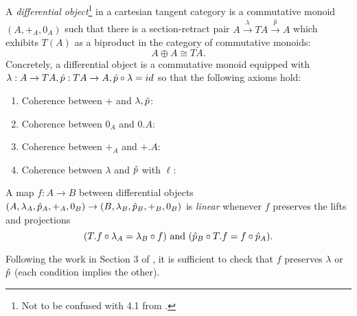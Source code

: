 \begin{definition}
    \label{def:differential-object}
    A \emph{ differential object}\footnote{Not to be confused with 4.1 from \cite{Barr2002}.} in a cartesian tangent category is a commutative monoid $(A, +_A,0_A)$ such that there is a section-retract pair $A \xrightarrow{\lambda} TA \xrightarrow{\hat{p}} A$ which exhibits $T(A)$ as a biproduct in the category of commutative monoids:
        \[A \oplus A \cong TA.\]
    Concretely, a differential object is a commutative monoid equipped with $\lambda:A \to TA, \hat{p}:TA \to A, \hat{p} \circ \lambda = id$ so that the following axioms hold:
    \begin{enumerate}[DO.1]
    \item Coherence between $+$ and $\lambda, \hat{p}$:
        \[\]
    \item Coherence between $0_A$ and $0.A$:
      \[  \]    
    \item Coherence between $+_A$ and $+.A$:
        \[\]
    \item Coherence between $\lambda$ and $\hat{p}$ with $\ell$:
      \[\]
  \end{enumerate}
  A map $f:A \to B$ between differential objects $(A,\lambda_A, \hat{p}_A, +_A,0_B) \to (B,\lambda_B,\hat{p}_B, +_B, 0_B)$ is \emph{linear} whenever $f$ preserves the lifts and projections
  \[
      (T.f \circ \lambda_A = \lambda_B \circ f) \text{ and } (\hat{p}_B \circ T.f = f \circ \hat{p}_A).
  \]
\end{definition}
 Following the work in Section 3 of \cite{Cockett2018}, it is sufficient to check that $f$ preserves $\lambda$ or $\hat{p}$ (each condition implies the other).
